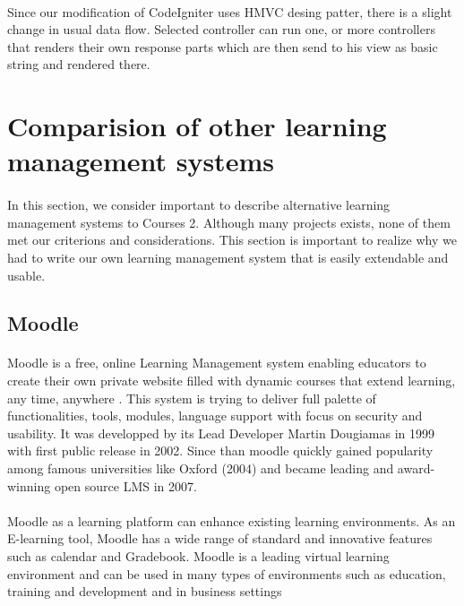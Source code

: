 \paragraph{}
Since our modification of CodeIgniter uses HMVC desing patter, there is a slight change in usual data flow. Selected controller can run one, or more controllers that renders their own response parts which are then send to his view as basic string and rendered there.

\section{Comparision of other learning management systems}
\paragraph{}
In this section, we consider important to describe alternative learning management systems to Courses 2. Although many projects exists, none of them met our criterions and considerations. This section is important to realize why we had to write our own learning management system that is easily extendable and usable.

\subsection{Moodle}
\paragraph{}
Moodle is a free, online Learning Management system enabling educators to create their own private website filled with dynamic courses that extend learning, any time, anywhere \cite{moodlesite}. This system is trying to deliver full palette of functionalities, tools, modules, language support with focus on security and usability. It was developped by its Lead Developer Martin Dougiamas in 1999 with first public release in 2002. Since than moodle quickly gained popularity among famous universities like Oxford (2004) and became leading and award-winning open source LMS in 2007. \cite{moodlesite}

\paragraph{}
Moodle as a learning platform can enhance existing learning environments. As an E-learning tool, Moodle has a wide range of standard and innovative features such as calendar and Gradebook. Moodle is a leading virtual learning environment and can be used in many types of environments such as education, training and development and in business settings \cite{moodlesite}




